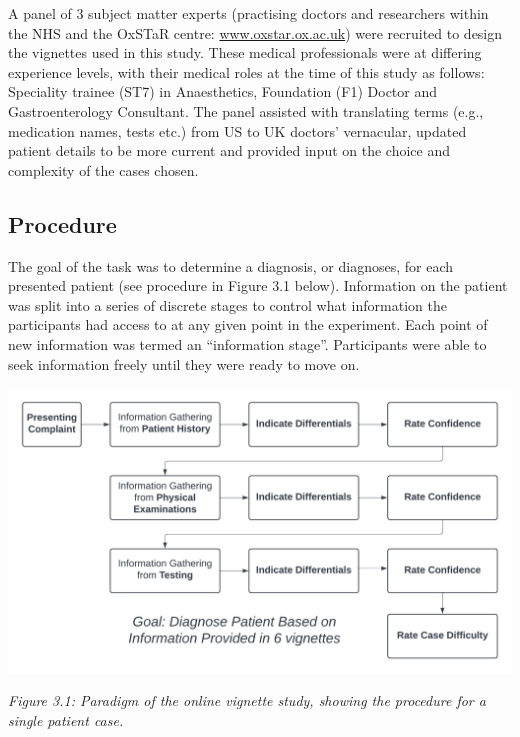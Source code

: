 \documentclass[a4paper, nobind]{templates/ociamthesis}
\begin{document}
A panel of 3 subject matter experts (practising doctors and researchers within the NHS and the OxSTaR centre: \url{www.oxstar.ox.ac.uk}) were recruited to design the vignettes used in this study. These medical professionals were at differing experience levels, with their medical roles at the time of this study as follows: Speciality trainee (ST7) in Anaesthetics, Foundation (F1) Doctor and Gastroenterology Consultant. The panel assisted with translating terms (e.g., medication names, tests etc.) from US to UK doctors' vernacular, updated patient details to be more current and provided input on the choice and complexity of the cases chosen.

\subsection*{Procedure}\label{procedure}

The goal of the task was to determine a diagnosis, or diagnoses, for each presented patient (see procedure in Figure 3.1 below). Information on the patient was split into a series of discrete stages to control what information the participants had access to at any given point in the experiment. Each point of new information was termed an ``information stage''. Participants were able to seek information freely until they were ready to move on.\\

\begin{center}\includegraphics[width=1\linewidth]{./assets/Paradigm} \end{center}

\emph{Figure 3.1: Paradigm of the online vignette study, showing the procedure for a single patient case.}

\newpage
\end{document}
